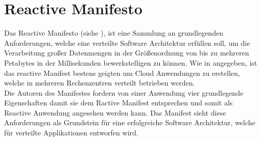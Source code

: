 \section{Reactive Manifesto}
Das {Reactive Manifesto} (siehe \cite{reactiveManifesto}), ist eine Sammlung an grundlegenden Anforderungen, welche eine verteilte Software Architektur erfüllen soll, um die Verarbeitung großer Datenmengen in der Größenordnung von bis zu mehreren Petabytes in der Millisekunden bewerkstelligen zu können. 
Wie in \cite{reactiveManifesto} angegeben, ist das {reactive Manifest} bestens geigten um Cloud Anwendungen zu erstellen, welche in mehreren Rechenzentren verteilt betrieben werden. \\
Die Autoren des Manifestes fordern von einer Anwendung vier grundlegende Eigenschaften damit sie dem {Ractive Manifest} entsprechen und somit als {Reactive Anwendung} angesehen werden kann. Das Manifest sieht diese Anforderungen als Grundstein für eine erfolgreiche Software Architektur, welche für verteilte Applikationen entworfen wird. 
